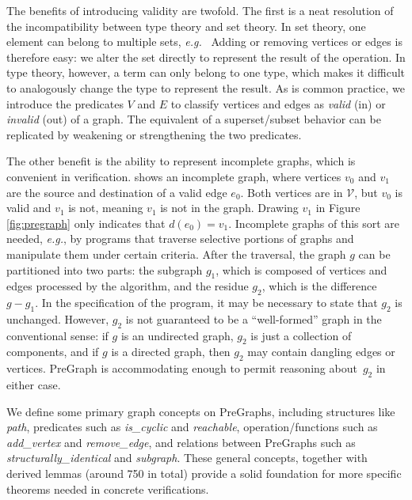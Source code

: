 The benefits of introducing validity are twofold. The first is a 
neat resolution of the incompatibility between type theory and set theory. 
In set theory, one
element can belong to multiple sets, \emph{e.g.}\ 
Adding or removing vertices or edges is therefore easy: we alter
the set directly to represent the result of the operation. 
In type theory, however, a term can only belong
to one type, which makes it difficult 
to analogously change the
type to represent the result. As is common practice, we introduce the
predicates $V$ and $E$ to classify vertices and edges as \emph{valid}
(in) or \emph{invalid} (out) of a graph. The equivalent of a superset/subset 
behavior can be replicated by weakening or strengthening the two predicates.

The other benefit is the ability to represent incomplete graphs, which is
convenient in verification.  
 shows an incomplete graph, 
where vertices $v_0$ and $v_1$
are the source and destination of a valid edge $e_0$. Both 
vertices are in $\mathcal{V}$, but $v_0$ is valid
and $v_1$ is not, meaning $v_1$ is not in the
graph. Drawing $v_1$ in Figure \ref{fig:pregraph} only indicates 
that $d(e_0) = v_1$. 
Incomplete graphs of this sort are needed, \emph{e.g.}, by programs
that traverse selective portions of graphs and manipulate them under 
certain criteria. 
After the traversal, the graph $g$ can be partitioned into two parts: the subgraph
$g_1$, which is composed of vertices and edges processed by the algorithm, 
and the residue $g_2$, which is the difference $g - g_1$. In
the specification of the program, it may be necessary to state that 
$g_2$ is unchanged. However, $g_2$ is not guaranteed to be a ``well-formed''
graph in the conventional sense:
if $g$ is an undirected graph,
$g_2$ is just a collection of  components, 
and if $g$ is a directed graph, then $g_2$ may contain dangling edges or
vertices. PreGraph is accommodating enough to permit reasoning
about~$g_2$ in either case.

We define some primary graph concepts on PreGraphs, 
including structures like \emph{path}, predicates 
such as \emph{is\_cyclic} and \emph{reachable},
operation/functions such as \emph{add\_vertex}
and \emph{remove\_edge}, and relations between PreGraphs such
as \emph{structurally\_identical} and \emph{subgraph}.  These general
concepts, together with derived lemmas (around 750 in total) provide a
solid foundation for more specific theorems needed in concrete
verifications.

